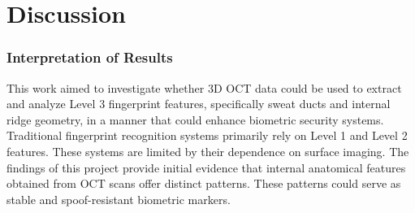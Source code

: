 \chapter{Discussion}
\subsection{Interpretation of Results}

This work aimed to investigate whether 3D OCT data could be used to extract and analyze Level 3 fingerprint features, specifically sweat ducts and internal ridge geometry, in a manner that could enhance biometric security systems. Traditional fingerprint recognition systems primarily rely on Level 1 and Level 2 features. These systems are limited by their dependence on surface imaging. The findings of this project provide initial evidence that internal anatomical features obtained from OCT scans offer distinct patterns. These patterns could serve as stable and spoof-resistant biometric markers. 

\begin{table}[ht]
\centering
\caption{Summary of quantitative results for the full dataset and subset of sweat duct points.}
\label{tab:results}
\end{table}

